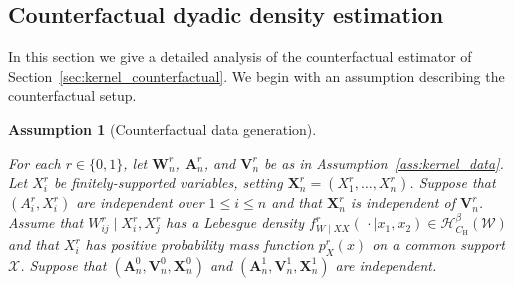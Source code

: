 \documentclass[11pt,lof]{puthesis}
\newcommand{\rH}{\ensuremath{\mathrm{H}}}
\newcommand{\bW}{\ensuremath{\mathbf{W}}}
\newcommand{\bX}{\ensuremath{\mathbf{X}}}
\newcommand{\bA}{\ensuremath{\mathbf{A}}}
\newcommand{\bV}{\ensuremath{\mathbf{V}}}
\newcommand{\cH}{\ensuremath{\mathcal{H}}}
\newcommand{\cX}{\ensuremath{\mathcal{X}}}
\newcommand{\cW}{\ensuremath{\mathcal{W}}}
\theoremstyle{break}
\newtheorem{assumption}{Assumption}[section]
\theoremstyle{proof}
\begin{document}
\subsection{Counterfactual dyadic density estimation}

In this section we give a detailed analysis of the counterfactual
estimator of Section~\ref{sec:kernel_counterfactual}.
We begin with an assumption describing the counterfactual setup.

\begin{assumption}[Counterfactual data generation]
  \label{ass:kernel_app_counterfactual}

  For each $r \in \{0,1\}$,
  let $\bW_n^r$, $\bA_n^r$, and $\bV_n^r$ be as in
  Assumption~\ref{ass:kernel_data}.
  Let $X_i^r$ be finitely-supported variables,
  setting $\bX_n^r = (X_1^r, \ldots, X_n^r)$.
  Suppose that $(A_i^r, X_i^r)$ are
  independent over $1 \leq i \leq n$
  and that $\bX_n^r$ is independent of $\bV_n^r$.
  Assume that $W_{i j}^r \mid X_i^r, X_j^r$
  has a Lebesgue density
  $f_{W \mid XX}^r(\,\cdot \mid x_1, x_2) \in \cH^\beta_{C_\rH}(\cW)$
  and that $X_i^r$ has positive
  probability mass function
  $p_X^r(x)$ on a common support $\cX$.
  Suppose that
  $(\bA_n^0, \bV_n^0, \bX_n^0)$
  and $(\bA_n^1, \bV_n^1, \bX_n^1)$
  are independent.

\end{assumption}
\end{document}
